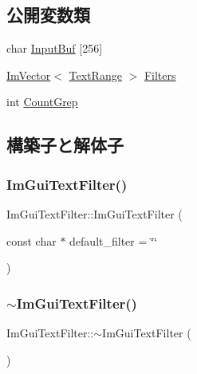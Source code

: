 \subsection*{公開変数類}
\begin{DoxyCompactItemize}
\item 
char \mbox{\hyperlink{struct_im_gui_text_filter_ad070acb1038199dd4e8f5d010c5cb5ba}{Input\+Buf}} \mbox{[}256\mbox{]}
\item 
\mbox{\hyperlink{class_im_vector}{Im\+Vector}}$<$ \mbox{\hyperlink{struct_im_gui_text_filter_1_1_text_range}{Text\+Range}} $>$ \mbox{\hyperlink{struct_im_gui_text_filter_a5a930a339a9384e6bfadfa56a7c111fd}{Filters}}
\item 
int \mbox{\hyperlink{struct_im_gui_text_filter_ac31839c319fe4211c21fc143b7249f86}{Count\+Grep}}
\end{DoxyCompactItemize}


\subsection{構築子と解体子}
\mbox{\label{struct_im_gui_text_filter_a0a61ee76f0b4f3c354791734b06e3140}} 
\subsubsection{\texorpdfstring{Im\+Gui\+Text\+Filter()}{ImGuiTextFilter()}}
{\footnotesize\ttfamily Im\+Gui\+Text\+Filter\+::\+Im\+Gui\+Text\+Filter (\begin{DoxyParamCaption}\item[{const char $\ast$}]{default\+\_\+filter = {\ttfamily \char`\"{}\char`\"{}} }\end{DoxyParamCaption})}

\mbox{\label{struct_im_gui_text_filter_acaf7fdcdc879c7938d195714609aac87}} 
\subsubsection{\texorpdfstring{$\sim$\+Im\+Gui\+Text\+Filter()}{~ImGuiTextFilter()}}
{\footnotesize\ttfamily Im\+Gui\+Text\+Filter\+::$\sim$\+Im\+Gui\+Text\+Filter (\begin{DoxyParamCaption}{ }\end{DoxyParamCaption})\hspace{0.3cm}{\ttfamily [inline]}}



